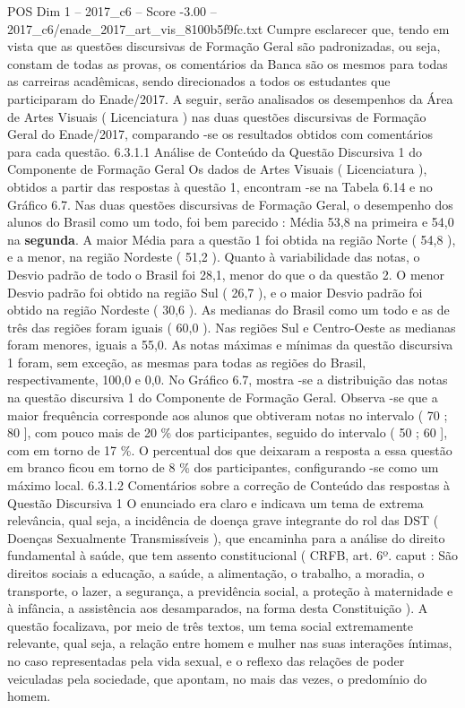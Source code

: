 \begin{textsample}{POS Dim 1 – 2017\_c6 – Score -3.00 – 2017\_c6/enade\_2017\_art\_vis\_8100b5f9fc.txt}
Cumpre esclarecer que, tendo em vista que as questões discursivas de Formação Geral são padronizadas, ou seja, constam de todas as provas, os comentários da Banca são os mesmos para todas as carreiras acadêmicas, sendo direcionados a todos os estudantes que participaram do Enade/2017.
A seguir, serão analisados os desempenhos da Área de Artes Visuais ( Licenciatura ) nas duas questões discursivas de Formação Geral do Enade/2017, comparando -se os resultados obtidos com comentários para cada questão. 6.3.1.1 Análise de Conteúdo da Questão Discursiva 1 do Componente de Formação Geral Os dados de Artes Visuais ( Licenciatura ), obtidos a partir das respostas à questão 1, encontram -se na Tabela 6.14 e no Gráfico 6.7.
Nas duas questões discursivas de Formação Geral, o desempenho dos alunos do Brasil como um todo, foi bem parecido : Média 53,8 na primeira e 54,0 na \textbf{segunda}.
A maior Média para a questão 1 foi obtida na região Norte ( 54,8 ), e a menor, na região Nordeste ( 51,2 ).
Quanto à variabilidade das notas, o Desvio padrão de todo o Brasil foi 28,1, menor do que o da questão 2.
O menor Desvio padrão foi obtido na região Sul ( 26,7 ), e o maior Desvio padrão foi obtido na região Nordeste ( 30,6 ).
As medianas do Brasil como um todo e as de três das regiões foram iguais ( 60,0 ).
Nas regiões Sul e Centro-Oeste as medianas foram menores, iguais a 55,0.
As notas máximas e mínimas da questão discursiva 1 foram, sem exceção, as mesmas para todas as regiões do Brasil, respectivamente, 100,0 e 0,0.
No Gráfico 6.7, mostra -se a distribuição das notas na questão discursiva 1 do Componente de Formação Geral.
Observa -se que a maior frequência corresponde aos alunos que obtiveram notas no intervalo ( 70 ; 80 ], com pouco mais de 20 \% dos participantes, seguido do intervalo ( 50 ; 60 ], com em torno de 17 \%.
O percentual dos que deixaram a resposta a essa questão em branco ficou em torno de 8 \% dos participantes, configurando -se como um máximo local. 6.3.1.2 Comentários sobre a correção de Conteúdo das respostas à Questão Discursiva 1 O enunciado era claro e indicava um tema de extrema relevância, qual seja, a incidência de doença grave integrante do rol das DST ( Doenças Sexualmente Transmissíveis ), que encaminha para a análise do direito fundamental à saúde, que tem assento constitucional ( CRFB, art. 6º. caput : São direitos sociais a educação, a saúde, a alimentação, o trabalho, a moradia, o transporte, o lazer, a segurança, a previdência social, a proteção à maternidade e à infância, a assistência aos desamparados, na forma desta Constituição ).
A questão focalizava, por meio de três textos, um tema social extremamente relevante, qual seja, a relação entre homem e mulher nas suas interações íntimas, no caso representadas pela vida sexual, e o reflexo das relações de poder veiculadas pela sociedade, que apontam, no mais das vezes, o predomínio do homem.

\end{textsample}
